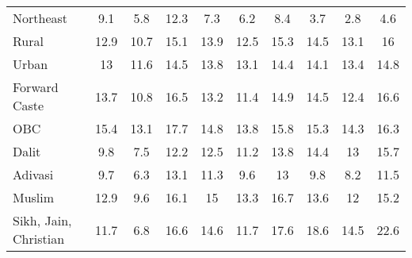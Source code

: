 \begin{tabular}{l*{9}{c}}
Northeast           &         9.1&         5.8&        12.3&         7.3&         6.2&         8.4&         3.7&         2.8&         4.6\\
Rural               &        12.9&        10.7&        15.1&        13.9&        12.5&        15.3&        14.5&        13.1&          16\\
Urban               &          13&        11.6&        14.5&        13.8&        13.1&        14.4&        14.1&        13.4&        14.8\\
Forward Caste       &        13.7&        10.8&        16.5&        13.2&        11.4&        14.9&        14.5&        12.4&        16.6\\
OBC                 &        15.4&        13.1&        17.7&        14.8&        13.8&        15.8&        15.3&        14.3&        16.3\\
Dalit               &         9.8&         7.5&        12.2&        12.5&        11.2&        13.8&        14.4&          13&        15.7\\
Adivasi             &         9.7&         6.3&        13.1&        11.3&         9.6&          13&         9.8&         8.2&        11.5\\
Muslim              &        12.9&         9.6&        16.1&          15&        13.3&        16.7&        13.6&          12&        15.2\\
Sikh, Jain, Christian&        11.7&         6.8&        16.6&        14.6&        11.7&        17.6&        18.6&        14.5&        22.6\\
\bottomrule
\end{tabular}
